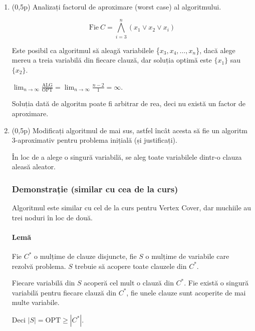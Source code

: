 \documentclass[a4paper,12pt]{article}
\newcommand*{\OPT}{\text{OPT}}
\newcommand*{\ALG}{\text{ALG}}
\begin{document}
\begin{enumerate}[label=\alph*)]
      \item (0,5p) Analizați factorul de aproximare (worst case) al algoritmului.


            \[\text{Fie}\ C = \bigwedge\limits_{i=3}^{n} (x_1 \lor x_2 \lor x_i)\]

            Este posibil ca algoritmul să aleagă variabilele \{$x_3, x_4, \dots, x_n$\},
            dacă alege mereu a treia variabilă din fiecare clauză,
            dar soluția optimă este $\{x_1\}$ sau $\{x_2\}$.

            $\lim_{n \to \infty} \frac{\ALG}{\OPT} = \lim_{n \to \infty} \frac{n - 2}{1} = \infty$.

            Soluția dată de algoritm poate fi arbitrar de rea, deci nu există un factor de aproximare.

      \item (0,5p) Modificați algoritmul de mai sus, astfel încât acesta să fie un algoritm 3-aproximativ
            pentru problema inițială (și justificați).

            În loc de a alege o singură variabilă, se aleg toate variabilele dintr-o clauza aleasă aleator.

            \subsubsection*{Demonstrație (similar cu cea de la curs)}

            Algoritmul este similar cu cel de la curs pentru Vertex Cover, dar muchiile au trei noduri în loc de două.

            \paragraph*{Lemă}

            Fie $C^*$ o mulțime de clauze disjuncte, fie $S$ o mulțime de variabile care rezolvă problema.
            $S$ trebuie să acopere toate clauzele din $C^*$.

            Fiecare variabilă din $S$ acoperă cel mult o clauză din $C^*$.
            Fie există o singură variabilă pentru fiecare clauză din $C^*$,
            fie unele clauze sunt acoperite de mai multe variabile.

            Deci $|S| = \OPT \geq |C^*|$.


\end{enumerate}
\end{document}
